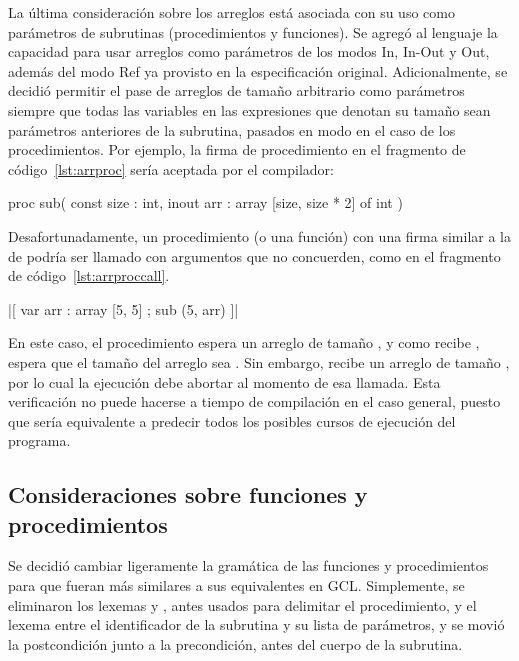 La última consideración sobre los arreglos está asociada con su uso como
parámetros de subrutinas (procedimientos y funciones). Se agregó al lenguaje la
capacidad para usar arreglos como parámetros de los modos In, In-Out y Out,
además del modo Ref ya provisto en la especificación original. Adicionalmente,
se decidió permitir el pase de arreglos de tamaño arbitrario como parámetros
siempre que todas las variables en las expresiones que denotan su tamaño sean
parámetros anteriores de la subrutina, pasados en modo  en el caso
de los procedimientos. Por ejemplo, la firma de procedimiento en el fragmento de código~\ref{lst:arrproc} sería
aceptada por el compilador:

\begin{gracielacode}[caption=Firma de procedimiento con parámetro de tipo arreglo, label=lst:arrproc]
proc sub(
  const size : int,
  inout arr : array [size, size * 2] of int
)
\end{gracielacode}

Desafortunadamente, un procedimiento (o una función) con una firma similar a la
de  podría ser llamado con argumentos que no concuerden, como en el
fragmento de código~\ref{lst:arrproccall}.

\begin{gracielacode}[caption=Llamada a procedimiento con argumento de tipo arreglo, label=lst:arrproccall]
|[ var arr : array [5, 5]
 ; sub (5, arr)
]|
\end{gracielacode}

En este caso, el procedimiento  espera un arreglo de tamaño
, y como recibe , espera que el tamaño
del arreglo sea \ingra{[5, 1~~0]}. Sin embargo, recibe un arreglo de tamaño
\ingra{[5, 5]}, por lo cual la ejecución debe abortar al momento de esa llamada.
Esta verificación no puede hacerse a tiempo de compilación en el caso general,
puesto que sería equivalente a predecir todos los posibles cursos de ejecución
del programa.

\subsection{Consideraciones sobre funciones y procedimientos}

Se decidió cambiar ligeramente la gramática de las funciones y procedimientos
para que fueran más similares a sus equivalentes en GCL. Simplemente, se
eliminaron los lexemas  y , antes usados para
delimitar el procedimiento, y el lexema \ingra{:} entre el identificador de la
subrutina y su lista de parámetros, y se movió la postcondición junto a la
precondición, antes del cuerpo de la subrutina.


